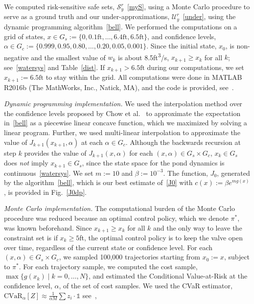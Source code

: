 \documentclass[letterpaper, 10 pt, conference]{ieeeconf}  %
\begin{document}
We computed risk-sensitive safe sets, $\mathcal{S}_y^r$~\eqref{myS}, using a Monte Carlo procedure to serve as a ground truth 
and our under-approximations, $\mathcal{U}_y^r$~\eqref{under}, using the dynamic programming algorithm~\eqref{bell}.
We performed the computations on a grid of states, $x \in G_s := \{0, 0.1\text{ft}, \dots, 6.4\text{ft}, 6.5\text{ft}\}$,
and confidence levels, $\alpha \in G_c := \{0.999, 0.95, 0.80, \dots, 0.20, 0.05, 0.001\}$.
Since the initial state, $x_0$, is non-negative and the smallest value of $w_k$ is about 8.5ft\textsuperscript{3}/s, 
$x_{k+1}\geq x_k$ for all $k$; see~\eqref{watersys} and Table~\ref{dist}. 
If $x_{k+1} > 6.5\text{ft}$ during our computations, we set $x_{k+1} := 6.5\text{ft}$ to stay within the grid.
All computations were done in MATLAB R2016b (The MathWorks, Inc., Natick, MA), and the code is provided, see~\cite{mycode}.

\textit{Dynamic programming implementation.} 
We used the interpolation method over the confidence levels proposed by Chow et al.~\cite{chow2015risk} 
to approximate the expectation in~\eqref{bell}
as a piecewise linear concave function, which we maximized by solving a linear program.\footnotemark
{}
Further, we used multi-linear interpolation to approximate the value of $J_{k+1}(x_{k+1}, \alpha)$ at each $\alpha \in G_c$.
Although the backwards recursion at step $k$ provides the value of $J_{k+1}(x, \alpha)$ for each $(x,\alpha) \in G_s \times G_c$,
$x_k \in G_s$ does \textit{not} imply $x_{k+1} \in G_s$, since the state space for the pond dynamics is continuous~\eqref{watersys}.
We set $m := 10$ and $\beta := 10^{-3}$.
The function, $J_0$, generated by the algorithm~\eqref{bell},
which is our best estimate of~\eqref{J0} with $c(x) := \beta e^{m g(x)}$, is provided in Fig.~\ref{J0dp}.


\textit{Monte Carlo implementation.}
The computational burden of the Monte Carlo procedure was reduced because an optimal control policy, which we denote $\pi^*$, was known beforehand.
Since $x_{k+1}\geq x_k$ for all $k$ and the only way to leave the constraint set is if $x_k \geq 5$ft,
the optimal control policy is to keep the valve open over time, regardless of the current state or confidence level.
For each $(x,\alpha) \in G_s \times G_c$, we sampled 100,000 trajectories starting from $x_0 := x$, subject to $\pi^*$.
For each trajectory sample, we computed the cost sample, $\max\{g(x_k) \mid k = 0, \dots, N\}$, and estimated the Conditional Value-at-Risk
at the confidence level, $\alpha$, of the set of cost samples. 
We used the CVaR estimator, $\text{CVaR}_\alpha[Z] \approx \frac{1}{\alpha M}\sum z_i\cdot \mathbb{1}$  
 see~\cite{shapiro2009lectures}, 
\end{document}
